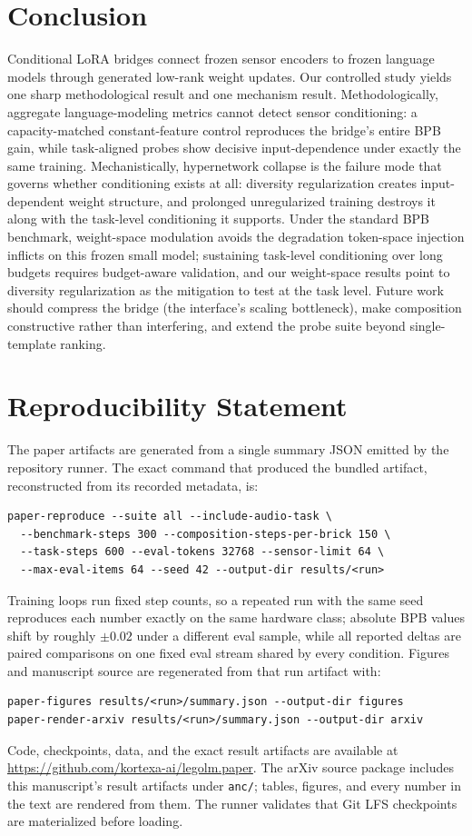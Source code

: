 \documentclass[11pt]{article}
\begin{document}
\section{Conclusion}
Conditional LoRA bridges connect frozen sensor encoders to frozen language models through generated low-rank weight updates. Our controlled study yields one sharp methodological result and one mechanism result. Methodologically, aggregate language-modeling metrics cannot detect sensor conditioning: a capacity-matched constant-feature control reproduces the bridge's entire BPB gain, while task-aligned probes show decisive input-dependence under exactly the same training. Mechanistically, hypernetwork collapse is the failure mode that governs whether conditioning exists at all: diversity regularization creates input-dependent weight structure, and prolonged unregularized training destroys it along with the task-level conditioning it supports. Under the standard BPB benchmark, weight-space modulation avoids the degradation token-space injection inflicts on this frozen small model; sustaining task-level conditioning over long budgets requires budget-aware validation, and our weight-space results point to diversity regularization as the mitigation to test at the task level. Future work should compress the bridge (the interface's scaling bottleneck), make composition constructive rather than interfering, and extend the probe suite beyond single-template ranking.

\section*{Reproducibility Statement}
The paper artifacts are generated from a single summary JSON emitted by the repository runner. The exact command that produced the bundled artifact, reconstructed from its recorded metadata, is:
\begin{verbatim}
paper-reproduce --suite all --include-audio-task \
  --benchmark-steps 300 --composition-steps-per-brick 150 \
  --task-steps 600 --eval-tokens 32768 --sensor-limit 64 \
  --max-eval-items 64 --seed 42 --output-dir results/<run>
\end{verbatim}
Training loops run fixed step counts, so a repeated run with the same seed reproduces each number exactly on the same hardware class; absolute BPB values shift by roughly $\pm 0.02$ under a different eval sample, while all reported deltas are paired comparisons on one fixed eval stream shared by every condition.
Figures and manuscript source are regenerated from that run artifact with:
\begin{verbatim}
paper-figures results/<run>/summary.json --output-dir figures
paper-render-arxiv results/<run>/summary.json --output-dir arxiv
\end{verbatim}
Code, checkpoints, data, and the exact result artifacts are available at \url{https://github.com/kortexa-ai/legolm.paper}. The arXiv source package includes this manuscript's result artifacts under \texttt{anc/}; tables, figures, and every number in the text are rendered from them. The runner validates that Git LFS checkpoints are materialized before loading.



\end{document}
